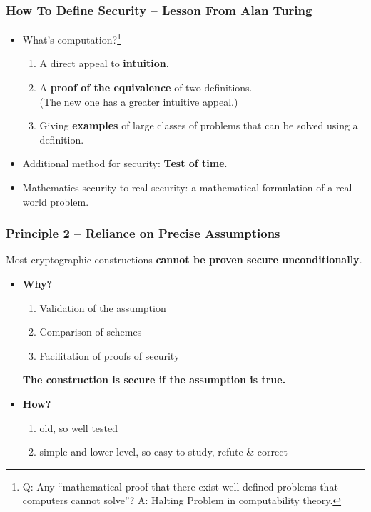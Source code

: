 \begin{frame}\frametitle{How To Define Security -- Lesson From Alan Turing}
\begin{itemize}
\item What's computation?\footnote{Q: Any ``mathematical proof that there exist well-defined problems that computers cannot solve''? A: Halting Problem in computability theory.}
\begin{enumerate}
\item A direct appeal to \textbf{intuition}.
\item A \textbf{proof of the equivalence} of two definitions.\\ (The new one has a greater intuitive appeal.)
\item Giving \textbf{examples} of large classes of problems that can be solved using a definition.
\end{enumerate}
\item Additional method for security: \textbf{Test of time}.
\item Mathematics security to real security: a mathematical formulation of a real-world problem.
\end{itemize}
\end{frame}
\begin{frame}\frametitle{Principle 2 -- Reliance on Precise Assumptions}
Most cryptographic constructions \textbf{cannot be proven secure unconditionally}.
\begin{itemize}
	\item \textbf{Why?} 
	\begin{enumerate}
		\item Validation of the assumption
		\item Comparison of schemes
		\item Facilitation of proofs of security
	\end{enumerate}
	\textbf{The construction is secure if the assumption is true.}
	\item \textbf{How?} 
	\begin{enumerate}
		\item old, so well tested
		\item simple and lower-level, so easy to study, refute \& correct
	\end{enumerate}
\end{itemize}
\end{frame}

